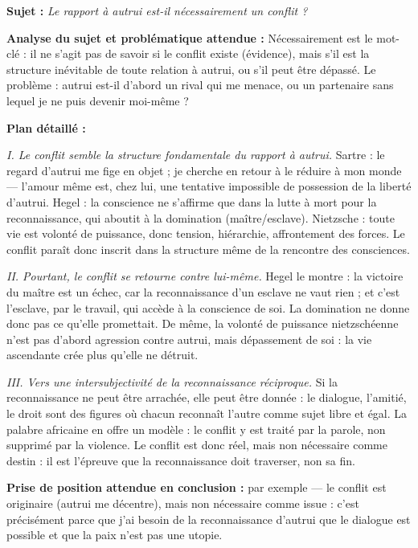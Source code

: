 \documentclass[11pt]{article}
\begin{document}
\begin{corrige}
\textbf{Sujet :} \emph{Le rapport à autrui est-il nécessairement un conflit ?}

\textbf{Analyse du sujet et problématique attendue :} \guillemotleft Nécessairement \guillemotright est le mot-clé : il ne s'agit pas de savoir si le conflit existe (évidence), mais s'il est la structure inévitable de toute relation à autrui, ou s'il peut être dépassé. Le problème : autrui est-il d'abord un rival qui me menace, ou un partenaire sans lequel je ne puis devenir moi-même ?

\textbf{Plan détaillé :}

\emph{I. Le conflit semble la structure fondamentale du rapport à autrui.} Sartre : le regard d'autrui me fige en objet ; je cherche en retour à le réduire à mon monde — l'amour même est, chez lui, une tentative impossible de possession de la liberté d'autrui. Hegel : la conscience ne s'affirme que dans la lutte à mort pour la reconnaissance, qui aboutit à la domination (maître/esclave). Nietzsche : toute vie est volonté de puissance, donc tension, hiérarchie, affrontement des forces. Le conflit paraît donc inscrit dans la structure même de la rencontre des consciences.

\emph{II. Pourtant, le conflit se retourne contre lui-même.} Hegel le montre : la victoire du maître est un échec, car la reconnaissance d'un esclave ne vaut rien ; et c'est l'esclave, par le travail, qui accède à la conscience de soi. La domination ne donne donc pas ce qu'elle promettait. De même, la volonté de puissance nietzschéenne n'est pas d'abord agression contre autrui, mais dépassement de soi : la vie ascendante crée plus qu'elle ne détruit.

\emph{III. Vers une intersubjectivité de la reconnaissance réciproque.} Si la reconnaissance ne peut être arrachée, elle peut être donnée : le dialogue, l'amitié, le droit sont des figures où chacun reconnaît l'autre comme sujet libre et égal. La palabre africaine en offre un modèle : le conflit y est traité par la parole, non supprimé par la violence. Le conflit est donc réel, mais non nécessaire comme destin : il est l'épreuve que la reconnaissance doit traverser, non sa fin.

\textbf{Prise de position attendue en conclusion :} par exemple — le conflit est originaire (autrui me décentre), mais non nécessaire comme issue : c'est précisément parce que j'ai besoin de la reconnaissance d'autrui que le dialogue est possible et que la paix n'est pas une utopie.


\end{corrige}
\end{document}
